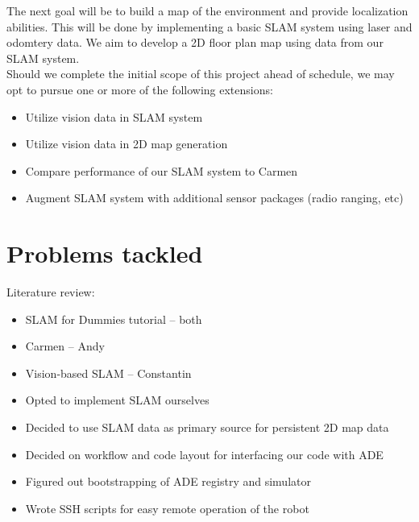 \documentclass[12pt]{article}
\begin{document}
The next goal will be to build a map of the environment and provide
localization abilities. This will be done by implementing a basic SLAM
system using laser and odomtery data.  We aim to develop a 2D floor plan map
using data from our SLAM system.\\

Should we complete the initial scope of this project ahead of schedule, we may
opt to pursue one or more of the following extensions:

\begin{itemize}
    \setlength{\itemsep}{0pt}
    \setlength{\parskip}{0pt}
    \setlength{\parsep}{0pt}
    \item Utilize vision data in SLAM system
    \item Utilize vision data in 2D map generation
    \item Compare performance of our SLAM system to Carmen
    \item Augment SLAM system with additional sensor packages (radio ranging,
          etc)
\end{itemize}


\section{Problems tackled}

Literature review:
\begin{itemize}
    \setlength{\itemsep}{0pt}
    \setlength{\parskip}{0pt}
    \setlength{\parsep}{0pt}
    \item SLAM for Dummies tutorial -- both
    \item Carmen -- Andy
    \item Vision-based SLAM -- Constantin
\end{itemize}

\begin{itemize}
    \setlength{\itemsep}{0pt}
    \setlength{\parskip}{0pt}
    \setlength{\parsep}{0pt}
    \item Opted to implement SLAM ourselves
    \item Decided to use SLAM data as primary source for persistent 2D map data
\end{itemize}

\begin{itemize}
    \setlength{\itemsep}{0pt}
    \setlength{\parskip}{0pt}
    \setlength{\parsep}{0pt}
    \item Decided on workflow and code layout for interfacing our code with ADE
    \item Figured out bootstrapping of ADE registry and simulator
    \item Wrote SSH scripts for easy remote operation of the robot
\end{itemize}
\end{document}
